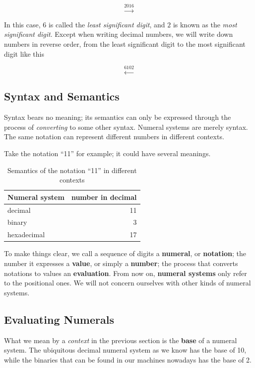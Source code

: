 \documentclass[\main/thesis.tex]{subfiles}
\begin{document}
$$ \xrightarrow{2016} $$

In this case, $ 6 $ is called the \textit{least significant digit},
and $ 2 $ is known as the \textit{most significant digit}.
Except when writing decimal numbers,
we will write down numbers in reverse order,
from the least significant digit to the most significant digit like this

$$ \xleftarrow{6102} $$

\subsection{Syntax and Semantics}

Syntax bears no meaning;
its semantics can only be expressed through the process of \textit{converting} to some other syntax.
Numeral systems are merely syntax.
The same notation can represent different numbers in different contexts.

Take the notation ``11'' for example; it could have several meanings.

\begin{table}[H]
    \centering
    \begin{tabular}{ | l | r | }
    \textbf{Numeral system}      & \textbf{number in decimal}  \\
    \hline
    decimal             & 11    \\
    binary              & 3     \\
    hexadecimal         & 17    \\
    \end{tabular}
\caption{Semantics of the notation ``11'' in different contexts}
\label{table:4}
\end{table}


To make things clear, we call a sequence of digits a \textbf{numeral}, or \textbf{notation};
the number it expresses a \textbf{value}, or simply a \textbf{number};
the process that converts notations to values an \textbf{evaluation}.
From now on, \textbf{numeral systems} only refer to the positional ones.
We will not concern ourselves with other kinds of numeral systems.

\subsection{Evaluating Numerals}

What we mean by a \textit{context} in the previous section is the \textbf{base}
of a numeral system.
The ubiquitous decimal numeral system as we know has the base of 10,
while the binaries that can be found in our machines nowadays has the base of 2.
\end{document}

